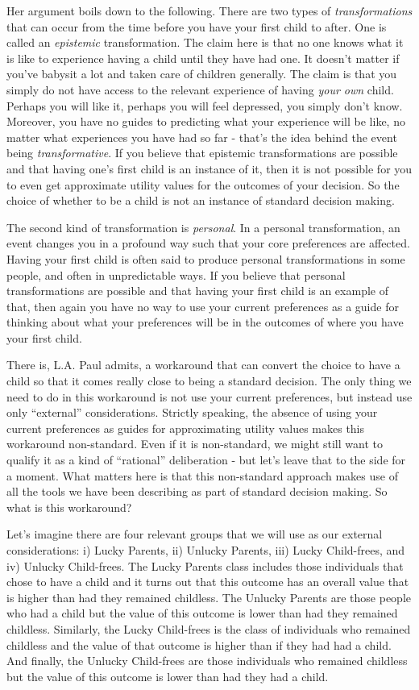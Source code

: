 \documentclass[]{tufte-book}
\begin{document}
Her argument boils down to the following. There are two types of \emph{transformations} that can occur from the time before you have your first child to after. One is called an \emph{epistemic} transformation. The claim here is that no one knows what it is like to experience having a child until they have had one. It doesn't matter if you've babysit a lot and taken care of children generally. The claim is that you simply do not have access to the relevant experience of having \emph{your own} child. Perhaps you will like it, perhaps you will feel depressed, you simply don't know. Moreover, you have no guides to predicting what your experience will be like, no matter what experiences you have had so far - that's the idea behind the event being \emph{transformative}. If you believe that epistemic transformations are possible and that having one's first child is an instance of it, then it is not possible for you to even get approximate utility values for the outcomes of your decision. So the choice of whether to be a child is not an instance of standard decision making.

The second kind of transformation is \emph{personal}. In a personal transformation, an event changes you in a profound way such that your core preferences are affected. Having your first child is often said to produce personal transformations in some people, and often in unpredictable ways. If you believe that personal transformations are possible and that having your first child is an example of that, then again you have no way to use your current preferences as a guide for thinking about what your preferences will be in the outcomes of where you have your first child.

There is, L.A. Paul admits, a workaround that can convert the choice to have a child so that it comes really close to being a standard decision. The only thing we need to do in this workaround is not use your current preferences, but instead use only ``external'' considerations. Strictly speaking, the absence of using your current preferences as guides for approximating utility values makes this workaround non-standard. Even if it is non-standard, we might still want to qualify it as a kind of ``rational'' deliberation - but let's leave that to the side for a moment. What matters here is that this non-standard approach makes use of all the tools we have been describing as part of standard decision making. So what is this workaround?

Let's imagine there are four relevant groups that we will use as our external considerations: i) Lucky Parents, ii) Unlucky Parents, iii) Lucky Child-frees, and iv) Unlucky Child-frees. The Lucky Parents class includes those individuals that chose to have a child and it turns out that this outcome has an overall value that is higher than had they remained childless. The Unlucky Parents are those people who had a child but the value of this outcome is lower than had they remained childless. Similarly, the Lucky Child-frees is the class of individuals who remained childless and the value of that outcome is higher than if they had had a child. And finally, the Unlucky Child-frees are those individuals who remained childless but the value of this outcome is lower than had they had a child.
\end{document}
